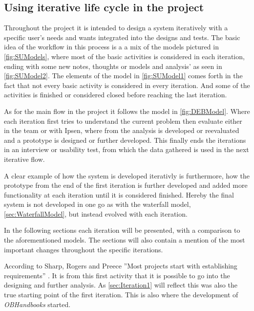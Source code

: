 
\subsection{Using iterative life cycle in the project}
Throughout the project it is intended to design a system iteratively with a specific user’s needs and wants integrated into the designs and tests.
The basic idea of the workflow in this process is a a mix of the models pictured in \cref{fig:SUModels}, where most of the basic activities is considered in each iteration, ending with some new notes, thoughts or models and analysis' as seen in \cref{fig:SUModel2}.
The elements of the model in \cref{fig:SUModel1} comes forth in the fact that not every basic activity is considered in every iteration. And some of the activities is finished or considered closed before reaching the last iteration.

As for the main flow in the project it follows the model in \cref{fig:DEBModel}. Where each iteration first tries to understand the current problem then evaluate either in the team or with Ipsen, where from the analysis is developed or reevaluated and a prototype is designed or further developed.
This finally ends the iterations in an interview or usability test, from which the data gathered is used in the next iterative flow.

A clear example of how the system is developed iterativly is furthermore, how the prototype from the end of the first iteration is further developed and added more functionality at each iteration until it is considered finished.
Hereby the final system is not developed in one go as with the waterfall model, \cref{sec:WaterfallModel},  but instead evolved with each iteration.

In the following sections each iteration will be presented, with a comparison to the aforementioned models.
The sections will also contain a mention of the most important changes throughout the specific iterations.

According to Sharp, Rogers and Preece ''Most projects start with establishing requirements'' \citep[p.~333]{InteractionDesign}.
It is from this first activity that it is possible to go into the designing and further analysis.
As \cref{sec:Iteration1} will reflect this was also the true starting point of the first iteration.
This is also where the development of \textit{OBHandbooks} started.
